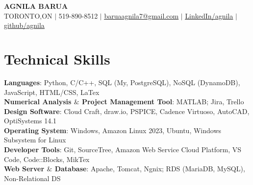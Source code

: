 \documentclass[letterpaper,11pt]{article}
\makeatletter
\newcommand{\resumeSubheading}[4]{
  \vspace{-2pt}\item
    \begin{tabular*}{0.97\textwidth}[t]{l@{\extracolsep{\fill}}r}
      \textbf{#1} & #2 \\
      \textit{\small#3} & \textit{\small #4} \\
    \end{tabular*}\vspace{-7pt}
}
\newcommand{\resumeSubHeadingListStart}{\begin{itemize}[leftmargin=0.15in, label={}]}
\newcommand{\resumeSubHeadingListEnd}{\end{itemize}}
\makeatother
\begin{document}

\begin{center}
    \textbf{\LARGE \scshape AGNILA BARUA} \\ \vspace{1pt}
    \small TORONTO,ON $|$ 519-890-8512 $|$ \href{mailto:baruaagnila7@gmail.com}{\underline{baruaagnila7@gmail.com}} $|$ 
    \href{https://www.linkedin.com/in/agnila-barua/}{\underline{LinkedIn/agnila}} $|$
    \href{https://github.com/agnila7}{\underline{github/agnila}}
\end{center}


\section{Technical Skills}
 \begin{itemize}[leftmargin=0.15in, label={}]
    \small{\item{
     \textbf{Languages}{: Python, C/C++, SQL (My, PostgreSQL), NoSQL (DynamoDB), JavaScript, HTML/CSS, LaTex} \\
     \textbf{Numerical Analysis $\&$ Project Management Tool}{: MATLAB; Jira, Trello } \\
     \textbf{Design Software}{: Cloud Craft, draw.io, PSPICE, Cadence Virtuoso, AutoCAD, OptiSystems 14.1 } \\
     \textbf{Operating System}{: Windows, Amazon Linux 2023, Ubuntu, Windows Subsystem for Linux} \\
     \textbf{Developer Tools}{: Git, SourceTree, Amazon Web Service Cloud Platform, VS Code, Code::Blocks, MikTex} \\
     \textbf{Web Server $\&$ Database}{: Apache, Tomcat, Ngnix; RDS (MariaDB, MySQL), Non-Relational DS}
    }}
 \end{itemize}

\end{document}
